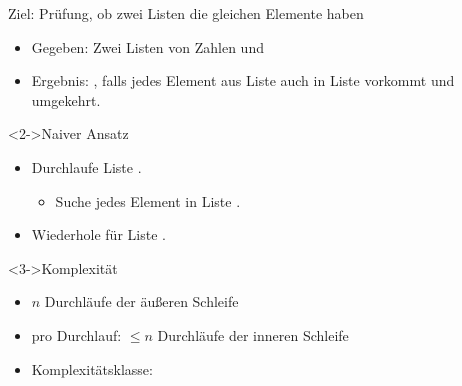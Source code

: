 \begin{frame}
    \begin{block}{Ziel: Prüfung, ob zwei Listen die gleichen Elemente haben}
        \begin{itemize}
            \item Gegeben: Zwei Listen von Zahlen  und 
            \item Ergebnis: , falls jedes Element aus Liste  auch in Liste  vorkommt und umgekehrt.
        \end{itemize}
    \end{block}
    \begin{block}<2->{Naiver Ansatz}
        \begin{itemize}
            \item Durchlaufe Liste .
            \begin{itemize}
                \item Suche jedes Element in Liste .
            \end{itemize}
            \item Wiederhole für Liste .
        \end{itemize}
    \end{block}
    \begin{block}<3->{Komplexität}
        \begin{itemize}
            \item $n$ Durchläufe der äußeren Schleife
            \item pro Durchlauf: $\leq n$ Durchläufe der inneren Schleife
            \item Komplexitätsklasse: \osquare
        \end{itemize}
    \end{block}
\end{frame}

